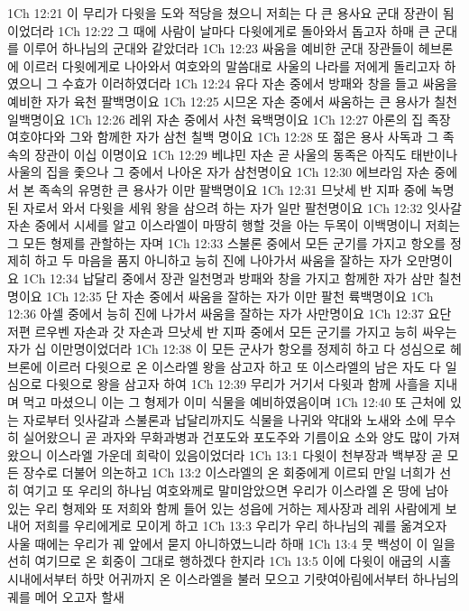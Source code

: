 1Ch 12:21  이 무리가 다윗을 도와 적당을 쳤으니 저희는 다 큰 용사요 군대 장관이 됨이었더라
1Ch 12:22  그 때에 사람이 날마다 다윗에게로 돌아와서 돕고자 하매 큰 군대를 이루어 하나님의 군대와 같았더라
1Ch 12:23  싸움을 예비한 군대 장관들이 헤브론에 이르러 다윗에게로 나아와서 여호와의 말씀대로 사울의 나라를 저에게 돌리고자 하였으니 그 수효가 이러하였더라
1Ch 12:24  유다 자손 중에서 방패와 창을 들고 싸움을 예비한 자가 육천 팔백명이요
1Ch 12:25  시므온 자손 중에서 싸움하는 큰 용사가 칠천 일백명이요
1Ch 12:26  레위 자손 중에서 사천 육백명이요
1Ch 12:27  아론의 집 족장 여호야다와 그와 함께한 자가 삼천 칠백 명이요
1Ch 12:28  또 젊은 용사 사독과 그 족속의 장관이 이십 이명이요
1Ch 12:29  베냐민 자손 곧 사울의 동족은 아직도 태반이나 사울의 집을 좇으나 그 중에서 나아온 자가 삼천명이요
1Ch 12:30  에브라임 자손 중에서 본 족속의 유명한 큰 용사가 이만 팔백명이요
1Ch 12:31  므낫세 반 지파 중에 녹명된 자로서 와서 다윗을 세워 왕을 삼으려 하는 자가 일만 팔천명이요
1Ch 12:32  잇사갈 자손 중에서 시세를 알고 이스라엘이 마땅히 행할 것을 아는 두목이 이백명이니 저희는 그 모든 형제를 관할하는 자며
1Ch 12:33  스불론 중에서 모든 군기를 가지고 항오를 정제히 하고 두 마음을 품지 아니하고 능히 진에 나아가서 싸움을 잘하는 자가 오만명이요
1Ch 12:34  납달리 중에서 장관 일천명과 방패와 창을 가지고 함께한 자가 삼만 칠천명이요
1Ch 12:35  단 자손 중에서 싸움을 잘하는 자가 이만 팔천 륙백명이요
1Ch 12:36  아셀 중에서 능히 진에 나가서 싸움을 잘하는 자가 사만명이요
1Ch 12:37  요단 저편 르우벤 자손과 갓 자손과 므낫세 반 지파 중에서 모든 군기를 가지고 능히 싸우는 자가 십 이만명이었더라
1Ch 12:38  이 모든 군사가 항오를 정제히 하고 다 성심으로 헤브론에 이르러 다윗으로 온 이스라엘 왕을 삼고자 하고 또 이스라엘의 남은 자도 다 일심으로 다윗으로 왕을 삼고자 하여
1Ch 12:39  무리가 거기서 다윗과 함께 사흘을 지내며 먹고 마셨으니 이는 그 형제가 이미 식물을 예비하였음이며
1Ch 12:40  또 근처에 있는 자로부터 잇사갈과 스불론과 납달리까지도 식물을 나귀와 약대와 노새와 소에 무수히 실어왔으니 곧 과자와 무화과병과 건포도와 포도주와 기름이요 소와 양도 많이 가져왔으니 이스라엘 가운데 희락이 있음이었더라
1Ch 13:1  다윗이 천부장과 백부장 곧 모든 장수로 더불어 의논하고
1Ch 13:2  이스라엘의 온 회중에게 이르되 만일 너희가 선히 여기고 또 우리의 하나님 여호와께로 말미암았으면 우리가 이스라엘 온 땅에 남아 있는 우리 형제와 또 저희와 함께 들어 있는 성읍에 거하는 제사장과 레위 사람에게 보내어 저희를 우리에게로 모이게 하고
1Ch 13:3  우리가 우리 하나님의 궤를 옮겨오자 사울 때에는 우리가 궤 앞에서 묻지 아니하였느니라 하매
1Ch 13:4  뭇 백성이 이 일을 선히 여기므로 온 회중이 그대로 행하겠다 한지라
1Ch 13:5  이에 다윗이 애굽의 시홀 시내에서부터 하맛 어귀까지 온 이스라엘을 불러 모으고 기럇여아림에서부터 하나님의 궤를 메어 오고자 할새
